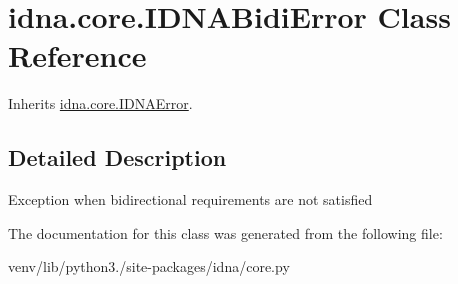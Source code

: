 \hypertarget{classidna_1_1core_1_1_i_d_n_a_bidi_error}{}\section{idna.\+core.\+I\+D\+N\+A\+Bidi\+Error Class Reference}
\label{classidna_1_1core_1_1_i_d_n_a_bidi_error}


Inherits \hyperlink{classidna_1_1core_1_1_i_d_n_a_error}{idna.\+core.\+I\+D\+N\+A\+Error}.



\subsection{Detailed Description}
\begin{DoxyVerb}Exception when bidirectional requirements are not satisfied \end{DoxyVerb}
 

The documentation for this class was generated from the following file\+:\begin{DoxyCompactItemize}
\item 
venv/lib/python3./site-\/packages/idna/core.\+py\end{DoxyCompactItemize}
